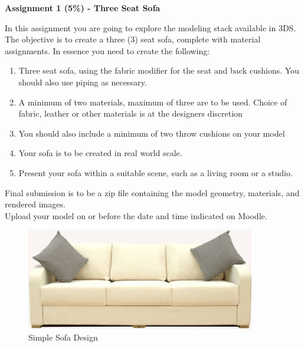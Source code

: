 
	
\begin{flushleft}
\Large\textbf{Assignment 1 (5\%) - Three Seat Sofa }\\
\end{flushleft}

In this assignment you are going to explore the modeling stack available in 3DS.  The objective is to create a three (3) seat sofa, complete with material assignments.  In essence you need to create the following:
\begin{enumerate}
	\item Three seat sofa, using the fabric modifier for the seat and back cushions.  You should also use piping as necessary.
	\item A minimum of two materials, maximum of three are to be used.  Choice of fabric, leather or other materials is at the designers discretion
	\item You should also include a minimum of two throw cushions on your model
	\item Your sofa is to be created in real world scale.
	\item Present your sofa within a suitable scene, such as a living room or a studio.
\end{enumerate}

Final submission is to be a zip file containing the model geometry, materials, and rendered images.\\

Upload your model on or before the date and time indicated on Moodle.
\vspace{1cm}

\begin{figure}[hb]
	\centering
		\includegraphics[width=10cm]{img/Holl_3_Seat_Sofa-1435.jpg}
		\caption{Simple Sofa Design}
	\label{fig:Holl_3_Seat_Sofa-1435}
\end{figure}


